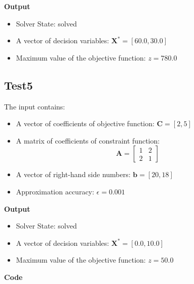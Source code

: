 \documentclass[12pt, legalpaper]{exam}
\begin{document}
\noindent  \textbf{Output}
\begin{itemize}
    \item Solver State: solved
    \item A vector of decision variables: $\mathbf{X^*} = [60.0, 30.0]$
    \item Maximum value of the objective function: $z = 780.0$
\end{itemize}

\vspace{1cm}

\subsection*{Test5}
The input contains:
\begin{itemize}
    \item A vector of coefficients of objective function: $\mathbf{C} = [2, 5]$
    \item A matrix of coefficients of constraint function:
    \[
    \mathbf{A} =
    \begin{bmatrix}
    1 & 2 \\
    2 & 1
    \end{bmatrix}
    \]
    \item A vector of right-hand side numbers: $\mathbf{b} = [20, 18]$
    \item Approximation accuracy: $\epsilon = 0.001$
\end{itemize}

\noindent  \textbf{Output}
\begin{itemize}
    \item Solver State: solved
    \item A vector of decision variables: $\mathbf{X^*} = [0.0, 10.0]$
    \item Maximum value of the objective function: $z = 50.0$
\end{itemize}

\vspace{1cm}

\noindent
{}




\vspace{24pt}
\noindent     \textbf{Code}
\end{document}
